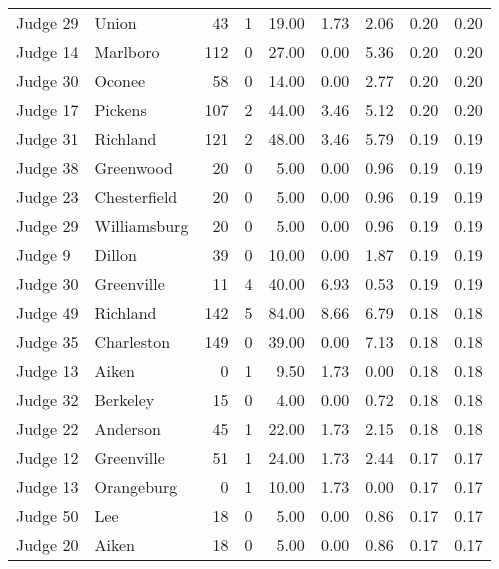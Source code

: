 \begin{tabular}{llrrrrrrr}
Judge 29 &        Union &    43 &      1 & 19.00 &       1.73 &      2.06 &         0.20 &      0.20 \\
Judge 14 &     Marlboro &   112 &      0 & 27.00 &       0.00 &      5.36 &         0.20 &      0.20 \\
Judge 30 &       Oconee &    58 &      0 & 14.00 &       0.00 &      2.77 &         0.20 &      0.20 \\
Judge 17 &      Pickens &   107 &      2 & 44.00 &       3.46 &      5.12 &         0.20 &      0.20 \\
Judge 31 &     Richland &   121 &      2 & 48.00 &       3.46 &      5.79 &         0.19 &      0.19 \\
Judge 38 &    Greenwood &    20 &      0 &  5.00 &       0.00 &      0.96 &         0.19 &      0.19 \\
Judge 23 & Chesterfield &    20 &      0 &  5.00 &       0.00 &      0.96 &         0.19 &      0.19 \\
Judge 29 & Williamsburg &    20 &      0 &  5.00 &       0.00 &      0.96 &         0.19 &      0.19 \\
 Judge 9 &       Dillon &    39 &      0 & 10.00 &       0.00 &      1.87 &         0.19 &      0.19 \\
Judge 30 &   Greenville &    11 &      4 & 40.00 &       6.93 &      0.53 &         0.19 &      0.19 \\
Judge 49 &     Richland &   142 &      5 & 84.00 &       8.66 &      6.79 &         0.18 &      0.18 \\
Judge 35 &   Charleston &   149 &      0 & 39.00 &       0.00 &      7.13 &         0.18 &      0.18 \\
Judge 13 &        Aiken &     0 &      1 &  9.50 &       1.73 &      0.00 &         0.18 &      0.18 \\
Judge 32 &     Berkeley &    15 &      0 &  4.00 &       0.00 &      0.72 &         0.18 &      0.18 \\
Judge 22 &     Anderson &    45 &      1 & 22.00 &       1.73 &      2.15 &         0.18 &      0.18 \\
Judge 12 &   Greenville &    51 &      1 & 24.00 &       1.73 &      2.44 &         0.17 &      0.17 \\
Judge 13 &   Orangeburg &     0 &      1 & 10.00 &       1.73 &      0.00 &         0.17 &      0.17 \\
Judge 50 &          Lee &    18 &      0 &  5.00 &       0.00 &      0.86 &         0.17 &      0.17 \\
Judge 20 &        Aiken &    18 &      0 &  5.00 &       0.00 &      0.86 &         0.17 &      0.17 \\

\end{tabular}
